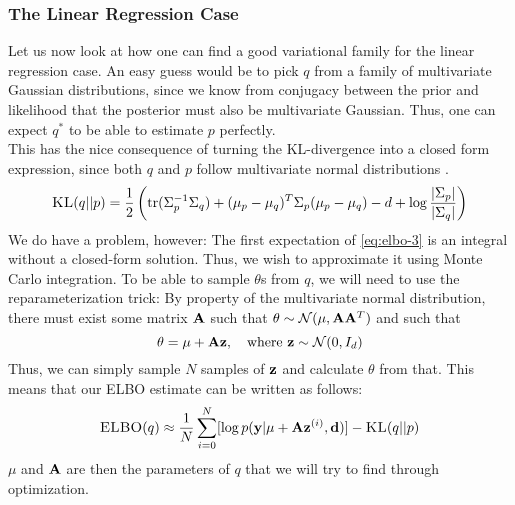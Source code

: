 \subsubsection{The Linear Regression Case}
Let us now look at how one can find a good variational family for the linear regression case.
An easy guess would be to pick $q$ from a family of multivariate Gaussian distributions, since we know from conjugacy between the prior and likelihood that the posterior must also be multivariate Gaussian.
Thus, one can expect $q^*$ to be able to estimate $p$ perfectly.\\
This has the nice consequence of turning the KL-divergence into a closed form expression, since both $q$ and $p$ follow multivariate normal distributions \cite{kld-gaussian}.\\
\begin{equation}\textsc{KL}(q || p) = \frac{1}{2}\left(\textrm{tr} (\Sigma_p^{-1}\Sigma_q) + (\mu_p -\mu_q)^T\Sigma_p(\mu_p - \mu_q) - d + \log \frac{|\Sigma_p|}{|\Sigma_q|}\right)\end{equation}
We do have a problem, however: The first expectation of \eqref{eq:elbo-3} is an integral without a closed-form solution.
Thus, we wish to approximate it using Monte Carlo integration. 
To be able to sample $\theta$s from $q$, we will need to use the reparameterization trick:
By property of the multivariate normal distribution, there must exist some matrix $\mathbf{A}$ such that $\theta \sim \mathcal{N}(\mu, \mathbf{A} \mathbf{A}^T)$ \cite{krause22}
and such that
\begin{equation}\theta = \mu + \B{A}\B{z}, \quad \textrm{where}\ \B{z}\sim \mathcal{N}(0,I_d)\end{equation}
Thus, we can simply sample $N$ samples of $\mathbf{z}$ and calculate $\theta$ from that. 
This means that our ELBO estimate can be written as follows:
\begin{equation}\textsc{ELBO}(q) \approx \frac{1}{N}\sum_{i=0}^N [\log p(\mathbf{y} | \mu + \mathbf{A}\mathbf{z}^{(i)}, \mathbf{d})] - \textsc{KL}(q || p)\label{eq:final-elbo}\end{equation}
$\mu$ and $\mathbf{A}$ are then the parameters of $q$ that we will try to find through optimization.

